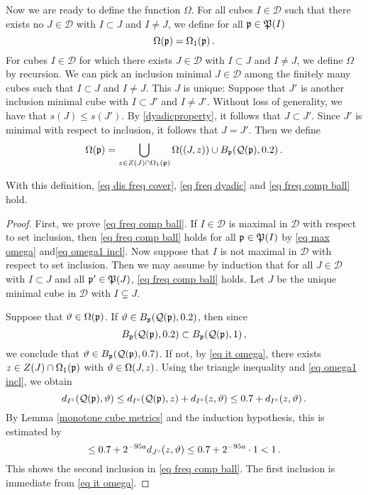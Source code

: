 {Now we are ready to define the function $\Omega$. For all cubes $I \in \mathcal{D}$ such that there exists no $J \in \mathcal{D}$ with $I \subset J$ and $I \ne J$, we define for all $\mathfrak p \in \mathfrak P(I)$
\begin{equation}
    \label{eq max omega}
    \Omega(\mathfrak p) = \Omega_1(\mathfrak p)\,.
\end{equation}
For cubes $I \in \mathcal{D}$ for which there exists $J \in \mathcal{D}$ with $I \subset J$ and $I \ne J$, we define $\Omega$ by recursion. We can pick an inclusion minimal $J \in \mathcal{D}$ among the finitely many cubes such that $I \subset J$ and $I \ne J$. This $J$ is unique: Suppose that $J'$ is another inclusion minimal cube with $I \subset J'$ and $I \ne J'$. Without loss of generality, we have that $s(J) \le s(J')$. By \eqref{dyadicproperty}, it follows that $J \subset J'$. Since $J'$ is minimal with respect to inclusion, it follows that $J = J'$.  Then we define
\begin{equation}
    \label{eq it omega}
    \Omega(\mathfrak p) = \bigcup_{z \in Z(J) \cap \Omega_1(\mathfrak p)} \Omega((J, z)) \cup B_{\mathfrak p}(\mathcal{Q}(\mathfrak p),0.2)\,.
\end{equation}

\begin{lemma}
\label{dyadic frequency cubes}

    With this definition, \eqref{eq dis freq cover}, \eqref{eq freq dyadic} and \eqref{eq freq comp ball} hold.
\end{lemma}

\begin{proof}
    First, we prove \eqref{eq freq comp ball}. If $I \in \mathcal{D}$ is maximal in $\mathcal{D}$ with respect to set inclusion, then \eqref{eq freq comp ball} holds for all $\mathfrak p \in \mathfrak P(I)$ by \eqref{eq max omega} and\eqref{eq omega1 incl}. Now suppose that $I$ is not maximal in $\mathcal{D}$ with respect to set inclusion. Then we may assume by induction that for all $J \in \mathcal{D}$ with $I \subset J$ and all $\mathfrak p' \in \mathfrak P(J)$, \eqref{eq freq comp ball} holds. Let $J$ be the unique minimal cube in $\mathcal{D}$ with $I \subsetneq J$.

    Suppose that $\vartheta \in \Omega(\mathfrak p)$. If $\vartheta\in B_{\mathfrak p}(\mathcal{Q}(\mathfrak p), 0.2)$, then since
    \begin{equation*}
        B_{\mathfrak p}(\mathcal{Q}(\mathfrak p), 0.2)\subset B_{\mathfrak p}(\mathcal{Q}(\mathfrak p), 1)\, ,
    \end{equation*}
    we conclude that $\vartheta\in B_{\mathfrak p}(\mathcal{Q}(\mathfrak p), 0.7)$. If not, by \eqref{eq it omega}, there exists $z \in Z(J) \cap \Omega_1(\mathfrak p)$ with $\vartheta \in \Omega(J,z)$. Using the triangle inequality and \eqref{eq omega1 incl}, we obtain
    $$
        d_{I^\circ}(\mathcal{Q}(\mathfrak p),\vartheta) \le d_{I^\circ}(\mathcal{Q}(\mathfrak p), z) + d_{I^\circ}(z, \vartheta) \le 0.7 + d_{I^\circ}(z, \vartheta)\,.
    $$
    By Lemma \ref{monotone cube metrics} and the induction hypothesis, this is estimated by
    $$
        \le 0.7 + 2^{-95a} d_{J^\circ}(z,\vartheta) \le 0.7 + 2^{-95a}\cdot 1 < 1\,.
    $$
    This shows the second inclusion in \eqref{eq freq comp ball}. The first inclusion is immediate from \eqref{eq it omega}.


\end{proof}}
